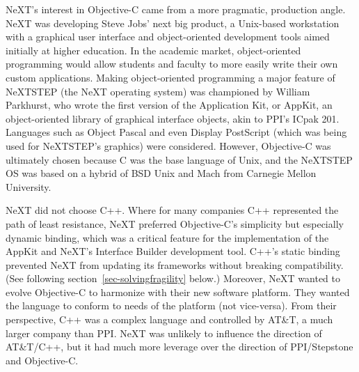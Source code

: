 \documentclass[acmsmall,screen]{acmart}
\begin{document}
NeXT's interest in Objective-C came from a more pragmatic, production angle. NeXT was developing Steve Jobs' next big product, a Unix-based workstation with a graphical user interface and object-oriented development tools aimed initially at higher education. In the academic market, object-oriented programming would allow students and faculty to more easily write their own custom applications. Making object-oriented programming a major feature of NeXTSTEP (the NeXT operating system) was championed by William Parkhurst, who wrote the first version of the Application Kit, or AppKit, an object-oriented library of graphical interface objects, akin to PPI's ICpak 201. Languages such as Object Pascal and even Display PostScript (which was being used for NeXTSTEP's graphics) were considered. However, Objective-C was ultimately chosen because C was the base language of Unix, and the NeXTSTEP OS was based on a hybrid of BSD Unix and Mach from Carnegie Mellon University.

NeXT did not choose C++. Where for many companies C++ represented the path of least resistance, NeXT preferred Objective-C's simplicity but especially dynamic binding, which was a critical feature for the implementation of the AppKit and NeXT's Interface Builder development tool. C++'s static binding prevented NeXT from updating its frameworks without breaking compatibility. (See following section~\ref{sec-solvingfragility} below.) Moreover, NeXT wanted to evolve Objective-C to harmonize with their new software platform. They wanted the language to conform to needs of the platform (not vice-versa). From their perspective, C++ was a complex language and controlled by AT\&T, a much larger company than PPI. NeXT was unlikely to influence the direction of AT\&T/C++, but it had much more leverage over the direction of PPI/Stepstone and Objective-C. 

\addtocounter{appendixpagenum}{1}
\end{document}
